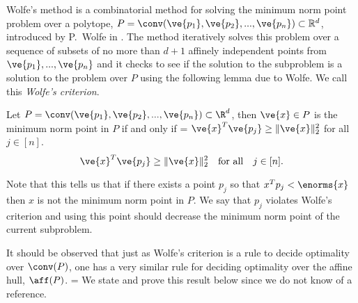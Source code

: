 
  


Wolfe's method is a combinatorial method for solving the minimum norm point problem over a polytope, $P = \conv(\ve{p_1}, \ve{p_2}, ..., \ve{p_n}) \subset \mathbb{R}^d$, introduced by P.~Wolfe in \cite{wolfe}. 
The method iteratively solves this problem over a sequence of subsets of no more than $d+1$ affinely independent points from $\ve{p_1}, ..., \ve{p_n}$ and it checks to see if the solution to the subproblem is a solution to the problem over $P$ using the following lemma due to Wolfe. We call this \emph{Wolfe's criterion}.

\begin{lemma}\label{lem:mnpcheck}\label{wolfec}
Let $P = \conv(\ve{p_1}, \ve{p_2}, ..., \ve{p_n}) \subset \R^d$, then $\ve{x} \in P$ is the minimum norm point in $P$ if and only if 
\ifnum\version=\stocversion
$\ve{x}^T \ve{p_j} \ge \|\ve{x}\|_2^2$ for all  $j \in [n]$.
\else
\[
\ve{x}^T \ve{p_j} \ge \|\ve{x}\|_2^2 \quad \text{for all} \quad j \in [n].
\]
\fi
\end{lemma}

Note that this tells us that if there exists a point $p_j$ so that $x^Tp_j < \enorms{x}$ then $x$ is not the minimum norm point in $P$.  
We say that $p_j$ violates Wolfe's criterion and using this point should decrease the minimum norm point of the current subproblem.

It should be observed that just as Wolfe's criterion is a rule to decide optimality over $\conv(P)$, one has a very similar
rule for deciding optimality over the affine hull, $\aff(P)$. 
\ifnum\version=\stocversion
We state and prove this result below since we do not know of a reference.
\fi


